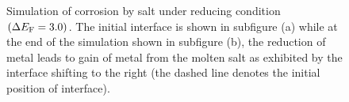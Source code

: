 \begin{figure}[!ht]
    \hfill
    \caption[Simulation of  corrosion by  salt under reducing condition $\left(\Delta E_{\ce{F}} = 3.0\right)$.]{Simulation of  corrosion by  salt under reducing condition $\left(\Delta E_{\ce{F}} = 3.0\right)$. The initial interface is shown in subfigure (a) while at the end of the simulation shown in subfigure (b), the reduction of  metal leads to gain of  metal from the molten salt as exhibited by the interface shifting to the right (the dashed line denotes the initial position of interface).}
    \label{fig:pfres3}
\end{figure}
       
